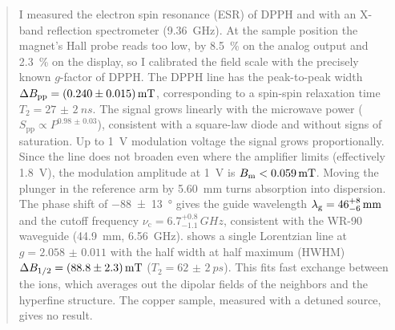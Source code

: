 \begin{abstract}
\noindent
I measured the electron spin resonance (ESR) of DPPH and  with an X-band reflection spectrometer
(\qty{9.36}{GHz}). At the sample position the magnet's Hall probe reads too low, by \qty{8.5}{\percent} on the
analog output and \qty{2.3}{\percent} on the display, so I calibrated the field scale with the precisely known $g$-factor
of DPPH. The DPPH line has the peak-to-peak width $\Bpp=\qty{0.240(15)}{mT}$, corresponding to a spin-spin
relaxation time $T_2=\qty{27(2)}{ns}$. The signal grows linearly with the microwave power
($S_\mathrm{pp}\propto P^{\num{0.98(3)}}$), consistent with a square-law diode and without signs of saturation.
Up to \qty{1}{V} modulation voltage the signal grows proportionally. Since the line does not broaden even where the
amplifier limits (effectively \qty{1.8}{V}), the modulation amplitude at \qty{1}{V} is $\Bm<\qty{0.059}{mT}$.
Moving the plunger in the reference arm by \qty{5.60}{mm} turns absorption into dispersion. The phase shift of
\qty{-88(13)}{\degree} gives the guide wavelength $\lamg=46^{+8}_{-6}\,\unit{mm}$ and the cutoff frequency
$\nu_\mathrm c=6.7^{+0.8}_{-1.1}\,\unit{GHz}$, consistent with the WR-90 waveguide (\qty{44.9}{mm}, \qty{6.56}{GHz}).
 shows a single Lorentzian line at $g=\num{2.058(11)}$ with the half width at half maximum (HWHM)
$\Bhalf=\qty{88.8(23)}{mT}$ ($T_2=\qty{62(2)}{ps}$). This fits fast exchange between the  ions, which averages out the dipolar
fields of the neighbors and the hyperfine structure. The copper sample, measured with a detuned source, gives no result.
\end{abstract}
